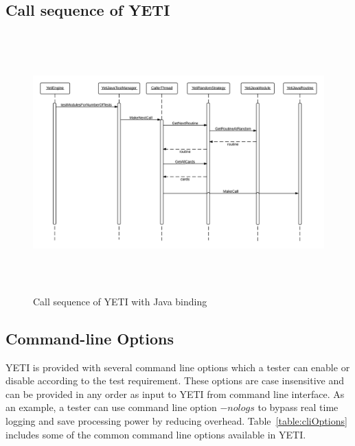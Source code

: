 \subsection{Call sequence of YETI}

\begin{figure}[h]
	\centering
	\includegraphics[width=15cm, height=10cm]{chapter3/sequenceDiagram.png}
	\caption{Call sequence of YETI with Java binding}
	\label{fig:yetiCore}
\end{figure}





\subsection{Command-line Options}
YETI is provided with several command line options which a tester can enable or disable according to the test requirement. These options are case insensitive and can be provided in any order as input to YETI from command line interface. As an example, a tester can use command line option $-nologs$ to bypass real time logging and save processing power by reducing overhead. Table~\ref{table:cliOptions} includes some of the common command line options available in YETI.

